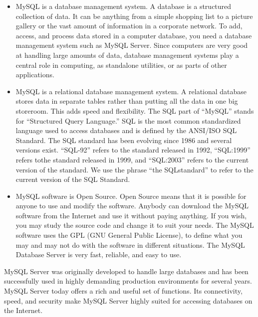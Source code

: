 \begin{itemize}
\item{MySQL is a database management system. A database is a structured collection of data. It can
be anything from a simple shopping list to a picture gallery or the vast amount of information
in a corporate network. To add, access, and process data stored in a computer database, you
need a database management system such as MySQL Server. Since computers are very good at
handling large amounts of data, database management systems play a central role in computing,
as standalone utilities, or as parts of other applications.}
\item{ MySQL is a relational database management system. A relational database stores data in
separate tables rather than putting all the data in one big storeroom. This adds speed and
flexibility. The SQL part of “MySQL” stands for “Structured Query Language.” SQL is the
most common standardized language used to access databases and is defined by the ANSI/ISO
SQL Standard. The SQL standard has been evolving since 1986 and several versions exist.
“SQL-92” refers to the standard released in 1992, “SQL:1999” refers tothe standard released in 1999, and “SQL:2003” refers to the current version of the standard. We use the phrase “the
SQLstandard” to refer to the current version of the SQL Standard.
}
\item{MySQL software is Open Source. Open Source means that it is possible for anyone to use and
modify the software. Anybody can download the MySQL software from the Internet and use it
without paying anything. If you wish, you may study the source code and change it to suit your
needs. The MySQL software uses the GPL (GNU General Public License), to define what you
may and may not do with the software in different situations. The MySQL Database Server is
very fast, reliable, and easy to use.}
\end{itemize}
MySQL Server was originally developed to handle large databases and has been successfully used in
highly demanding production environments for several years. MySQL Server today offers a rich and
useful set of functions. Its connectivity, speed, and security make MySQL Server highly suited for
accessing databases on the Internet.
